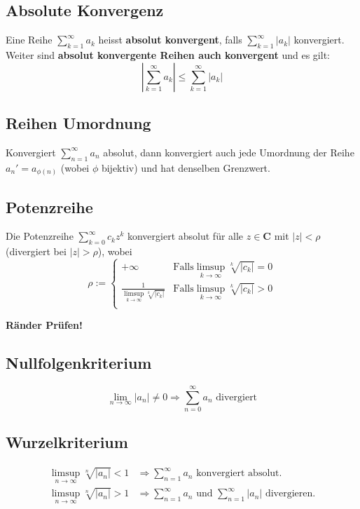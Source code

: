 \documentclass[8pt]{extarticle}
\begin{document}
\begin{multicols*}{3}
\subsection {Absolute Konvergenz}
Eine Reihe $\sum_{k = 1}^{\infty} a_k$ heisst \textbf{absolut konvergent},
falls $\sum_{k = 1}^{\infty} |a_k|$ konvergiert. Weiter sind \textbf{absolut konvergente Reihen
auch konvergent} und es gilt:
$$
  \left| \sum_{k = 1}^{\infty} a_k \right| \leq \sum_{k = 1}^{\infty} |a_k|
$$

\subsection{Reihen Umordnung}

Konvergiert $\sum_{n = 1}^\infty a_n$ absolut, dann konvergiert auch jede Umordnung
der Reihe $a_n' = a_{\phi(n)}$ (wobei $\phi$ bijektiv) und hat denselben Grenzwert.

\subsection {Potenzreihe}
Die Potenzreihe $\sum_{k = 0}^\infty c_k z^k$ konvergiert absolut für alle $z \in \mathbf{C}$
mit $|z| < \rho$ (divergiert bei $|z| > \rho$), wobei
$$
  \rho := \begin{cases}
    +\infty &\text{Falls} \limsup_{k \rightarrow \infty} \sqrt[k]{|c_k|} = 0\\
    \frac{1}{\limsup_{k \rightarrow \infty} \sqrt[k]{|c_k|}} &\text{Falls} \limsup_{k \rightarrow \infty} \sqrt[k]{|c_k|} > 0\\
  \end{cases}
$$
\begin{center}
  \color{red}
  \textbf{Ränder Prüfen!}
\end{center}
\subsection{Nullfolgenkriterium}
$$
  \lim_{n \rightarrow \infty} |a_n| \neq 0 \Rightarrow \sum_{n = 0}^\infty a_n \text{ divergiert}
$$

\subsection{Wurzelkriterium}

\begin{align*}
  \limsup_{n \rightarrow \infty} \sqrt[n]{|a_n|} < 1 &\Rightarrow \sum_{n = 1}^\infty a_n \text{ konvergiert absolut.}\\
  \limsup_{n \rightarrow \infty} \sqrt[n]{|a_n|} > 1 &\Rightarrow \sum_{n = 1}^\infty a_n \text{ und } \sum_{n = 1}^\infty |a_n| \text{ divergieren.}
\end{align*}


\end{multicols*}
\end{document}
